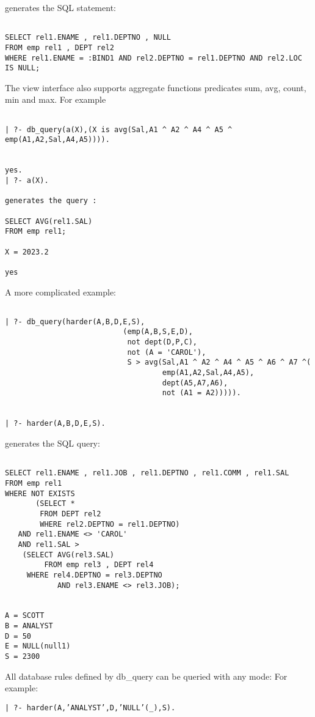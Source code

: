 generates the SQL statement:
\begin{verbatim}

SELECT rel1.ENAME , rel1.DEPTNO , NULL
FROM emp rel1 , DEPT rel2
WHERE rel1.ENAME = :BIND1 AND rel2.DEPTNO = rel1.DEPTNO AND rel2.LOC IS NULL;
\end{verbatim}

The view interface also supports aggregate functions predicates sum, avg,
count, min and max.  For example
\begin{verbatim}

| ?- db_query(a(X),(X is avg(Sal,A1 ^ A2 ^ A4 ^ A5 ^ emp(A1,A2,Sal,A4,A5)))).


yes.
| ?- a(X).

generates the query :

SELECT AVG(rel1.SAL)
FROM emp rel1;

X = 2023.2

yes
\end{verbatim}


A more complicated example:
\begin{verbatim}

| ?- db_query(harder(A,B,D,E,S), 
                           (emp(A,B,S,E,D),
                            not dept(D,P,C), 
                            not (A = 'CAROL'),
                            S > avg(Sal,A1 ^ A2 ^ A4 ^ A5 ^ A6 ^ A7 ^(
                                    emp(A1,A2,Sal,A4,A5),
                                    dept(A5,A7,A6),
                                    not (A1 = A2))))).


| ?- harder(A,B,D,E,S).
\end{verbatim}

generates the SQL query:
\begin{verbatim}

SELECT rel1.ENAME , rel1.JOB , rel1.DEPTNO , rel1.COMM , rel1.SAL
FROM emp rel1
WHERE NOT EXISTS
       (SELECT * 
        FROM DEPT rel2 
        WHERE rel2.DEPTNO = rel1.DEPTNO) 
   AND rel1.ENAME <> 'CAROL' 
   AND rel1.SAL > 
	(SELECT AVG(rel3.SAL) 
         FROM emp rel3 , DEPT rel4
	 WHERE rel4.DEPTNO = rel3.DEPTNO 
            AND rel3.ENAME <> rel3.JOB);


A = SCOTT
B = ANALYST
D = 50
E = NULL(null1)
S = 2300
\end{verbatim}

All database rules defined by db\_query can be queried with any mode:
For example:
\begin{center}

{\tt | ?- harder(A,'ANALYST',D,'NULL'(\_),S).}
\end{center}

